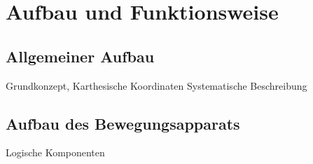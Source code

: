 
\section{Aufbau und Funktionsweise}
\subsection{Allgemeiner Aufbau}
Grundkonzept,
Karthesische Koordinaten
Systematische Beschreibung
\subsection{Aufbau des Bewegungsapparats}
Logische Komponenten
